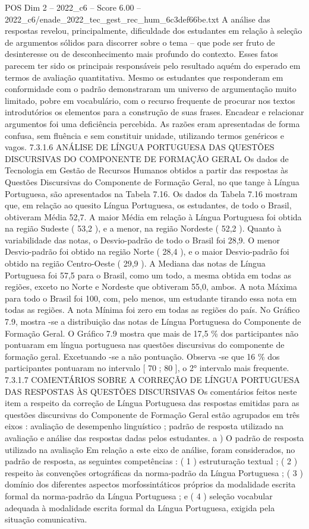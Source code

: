 \begin{textsample}{POS Dim 2 – 2022\_c6 – Score 6.00 – 2022\_c6/enade\_2022\_tec\_gest\_rec\_hum\_6c3def66be.txt}
A análise das respostas revelou, principalmente, dificuldade dos estudantes em relação à seleção de argumentos sólidos para discorrer sobre o tema – que pode ser fruto de desinteresse ou de desconhecimento mais profundo do contexto.
Esses fatos parecem ter sido os principais responsáveis pelo resultado aquém do esperado em termos de avaliação quantitativa.
Mesmo os estudantes que responderam em conformidade com o padrão demonstraram um universo de argumentação muito limitado, pobre em vocabulário, com o recurso frequente de procurar nos textos introdutórios os elementos para a construção de suas frases.
Encadear e relacionar argumentos foi uma deficiência percebida.
As razões eram apresentadas de forma confusa, sem fluência e sem constituir unidade, utilizando termos genéricos e vagos. 7.3.1.6 ANÁLISE DE LÍNGUA PORTUGUESA DAS QUESTÕES DISCURSIVAS DO COMPONENTE DE FORMAÇÃO GERAL Os dados de Tecnologia em Gestão de Recursos Humanos obtidos a partir das respostas às Questões Discursivas do Componente de Formação Geral, no que tange à Língua Portuguesa, são apresentados na Tabela 7.16.
Os dados da Tabela 7.16 mostram que, em relação ao quesito Língua Portuguesa, os estudantes, de todo o Brasil, obtiveram Média 52,7.
A maior Média em relação à Língua Portuguesa foi obtida na região Sudeste ( 53,2 ), e a menor, na região Nordeste ( 52,2 ).
Quanto à variabilidade das notas, o Desvio-padrão de todo o Brasil foi 28,9.
O menor Desvio-padrão foi obtido na região Norte ( 28,4 ), e o maior Desvio-padrão foi obtido na região Centro-Oeste ( 29,9 ).
A Mediana das notas de Língua Portuguesa foi 57,5 para o Brasil, como um todo, a mesma obtida em todas as regiões, exceto no Norte e Nordeste que obtiveram 55,0, ambos.
A nota Máxima para todo o Brasil foi 100, com, pelo menos, um estudante tirando essa nota em todas as regiões.
A nota Mínima foi zero em todas as regiões do país.
No Gráfico 7.9, mostra -se a distribuição das notas de Língua Portuguesa do Componente de Formação Geral.
O Gráfico 7.9 mostra que mais de 17,5 \% dos participantes não pontuaram em língua portuguesa nas questões discursivas do componente de formação geral.
Excetuando -se a não pontuação.
Observa -se que 16 \% dos participantes pontuaram no intervalo [ 70 ; 80 ], o 2{\EmojiFont °} intervalo mais frequente. 7.3.1.7 COMENTÁRIOS SOBRE A CORREÇÃO DE LÍNGUA PORTUGUESA DAS RESPOSTAS ÀS QUESTÕES DISCURSIVAS Os comentários feitos neste item a respeito da correção de Língua Portuguesa das respostas emitidas para as questões discursivas do Componente de Formação Geral estão agrupados em três eixos : avaliação de desempenho linguístico ; padrão de resposta utilizado na avaliação e análise das respostas dadas pelos estudantes. a ) O padrão de resposta utilizado na avaliação Em relação a este eixo de análise, foram considerados, no padrão de resposta, as seguintes competências : ( 1 ) estruturação textual ; ( 2 ) respeito às convenções ortográficas da norma-padrão da Língua Portuguesa ; ( 3 ) domínio dos diferentes aspectos morfossintáticos próprios da modalidade escrita formal da norma-padrão da Língua Portuguesa ; e ( 4 ) seleção vocabular adequada à modalidade escrita formal da Língua Portuguesa, exigida pela situação comunicativa.

\end{textsample}
